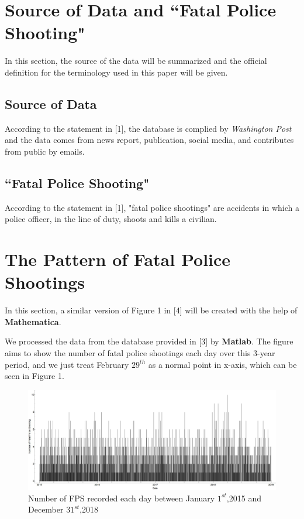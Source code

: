 \documentclass[a4paper]{article}
\begin{document}
{{\newpage
\section{Source of Data and ``Fatal Police Shooting"}
\par{In this section, the source of the data will be summarized and the official definition for the terminology used in this paper will be given.}
\subsection{Source of Data}
\par{According to the statement in [1], the database is complied by \emph{Washington Post} and the data comes from news report, publication, social media, and contributes from public by emails.}
\subsection{``Fatal Police Shooting"}
\par{According to the statement in [1], "fatal police shootings" are accidents in which a police officer, in the line of duty, shoots and kills a civilian.}


\newpage
\section{The Pattern of Fatal Police Shootings}
\par{In this section, a similar version of Figure 1 in [4] will be created with the help of \textbf{Mathematica}}.
\par{We processed the data from the database provided in [3] by \textbf{Matlab}. The figure aims to show the number of fatal police shootings each day over this 3-year period, and we just treat February $29^{th}$ as a normal point in x-axis, which can be seen in Figure 1.}
\begin{figure}[h]
    \centering
    \includegraphics[width = 17cm]{F1.jpg}
    \caption{Number of FPS recorded each day between January $1^{st}$,2015 and December $31^{st}$,2018}
    \label{f1}
\end{figure}

}}
\end{document}
